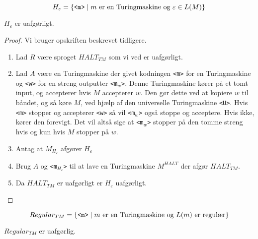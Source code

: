 \begin{equation*}
	H_{\varepsilon} = \{\text{\texttt{<m>}} \mid m \text{ er en Turingmaskine og } \varepsilon \in L(M)\}
\end{equation*}

\begin{theorem}
	$H_{\varepsilon}$ er uafgørligt.
\end{theorem}

\begin{proof}
	Vi bruger opskriften beskrevet tidligere.
	\begin{enumerate}
		\item Lad $R$ være sproget $HALT_{TM}$ som vi ved er uafgørligt.
		\item Lad $A$ være en Turingmaskine der givet kodningen \texttt{<m>} for en Turingmaskine og \texttt{<w>} for en streng outputter \texttt{<m$_{w}$>}. Denne Turingmaskine kører på et tomt input, og accepterer hvis $M$ accepterer $w$. Den gør dette ved at kopiere $w$ til båndet, og så køre $M$, ved hjælp af den universelle Turingmaskine \texttt{<U>}. Hvis \texttt{<m>} stopper og accepterer \texttt{<w>} så vil \texttt{<m$_{w}$>} også stoppe og acceptere. Hvis ikke, kører den forevigt. Det vil altså sige at \texttt{<m$_{w}$>} stopper på den tomme streng hvis og kun hvis $M$ stopper på $w$.
		\item Antag at $M_{H_{\varepsilon}}$ afgører $H_{\varepsilon}$
		\item Brug $A$ og \texttt{<m$_{H_{\varepsilon}}$>} til at lave en Turingmaskine $M^{HALT}$ der afgør $HALT_{TM}$.
		\item Da $HALT_{TM}$ er uafgørligt er $H_{\varepsilon}$ uafgørligt.
	\end{enumerate}

\end{proof}

\begin{equation*}
	Regular_{TM} = \{\text{\texttt{<m>}} \mid m \text{ er en Turingmaskine og }L(m) \text{ er regulær}\}
\end{equation*}

\begin{theorem}
	$Regular_{TM}$ er uafgørlig.
\end{theorem}

